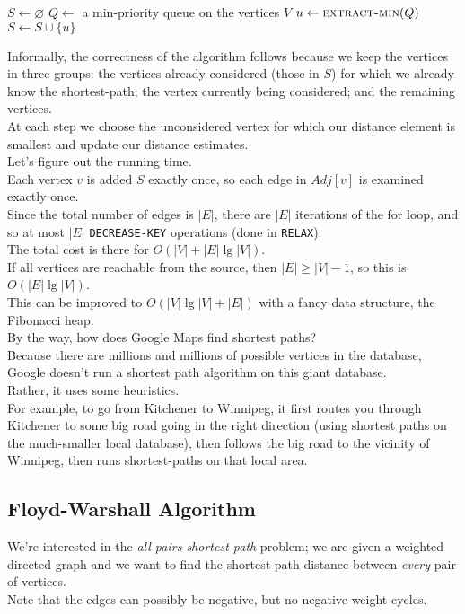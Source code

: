 \documentclass[12pt]{article}
\theoremstyle{plain}
\theoremstyle{definition}
\newcommand{\lecture}[1]{\marginpar{{\footnotesize $\leftarrow$ \underline{#1}}}}
\begin{document}
\begin{algorithmic}
  \State {}
  \State $S \gets \varnothing$
  \State $Q \gets$ a min-priority queue on the vertices $V$
    \State $u \gets \Call{extract-min}{Q}$
    \State $S \gets S \cup \{u\}$
      \State {}
    \EndFor
  \EndWhile
\EndFunction
\end{algorithmic}

Informally, the correctness of the algorithm follows because we keep the vertices in three groups: the vertices already considered (those in $S$) for which we already know the shortest-path; the vertex currently being considered; and the remaining vertices. \\
At each step we choose the unconsidered vertex for which our distance element is smallest and update our distance estimates. \\

Let's figure out the running time. \\
Each vertex $v$ is added $S$ exactly once, so each edge in $Adj[v]$ is examined exactly once. \\
Since the total number of edges is $|E|$, there are $|E|$ iterations of the for loop, and so at most $|E|$ \texttt{DECREASE-KEY} operations (done in \texttt{RELAX}). \\
The total cost is there for $O(|V| + |E|\lg{|V|})$. \\
If all vertices are reachable from the source, then $|E| \geq |V| - 1$, so this is $O(|E|\lg{|V|})$. \\
This can be improved to $O(|V|\lg{|V|} + |E|)$ with a fancy data structure, the Fibonacci heap. \\

By the way, how does Google Maps find shortest paths? \\
Because there are millions and millions of possible vertices in the database, Google doesn't run a shortest path algorithm on this giant database. \\
Rather, it uses some heuristics. \\
For example, to go from Kitchener to Winnipeg, it first routes you through Kitchener to some big road going in the right direction (using shortest paths on the much-smaller local database), then follows the big road to the vicinity of Winnipeg, then runs shortest-paths on that local area.

\subsection{Floyd-Warshall Algorithm}
\lecture{2016/11/15}
We're interested in the \emph{all-pairs shortest path} problem;
we are given a weighted directed graph and we want to find the shortest-path distance between \emph{every} pair of vertices. \\
Note that the edges can possibly be negative, but no negative-weight cycles. \\
\end{document}
